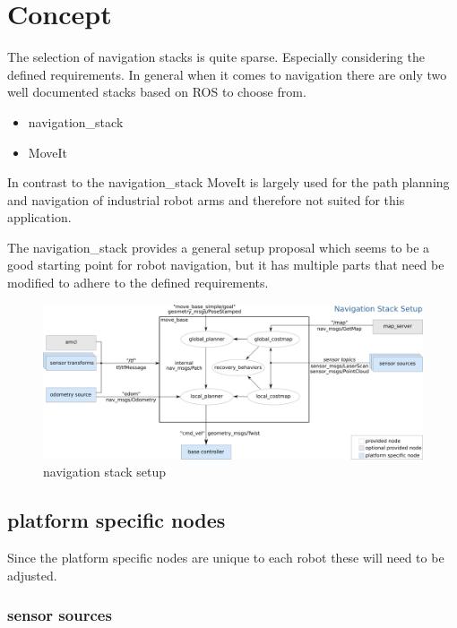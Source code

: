 \chapter{Concept}
\label{Concept}
The selection of navigation stacks is quite sparse. Especially considering the defined requirements. In general when it comes to navigation there are only two well documented stacks based on ROS to choose from.

\begin{itemize}
	\item navigation\_stack
	\item MoveIt
\end{itemize}

In contrast to the navigation\_stack MoveIt is largely used for the path planning and navigation of industrial robot arms and therefore not suited for this application.

The navigation\_stack provides a general setup proposal which seems to be a good starting point for robot navigation, but it has multiple parts that need be modified to adhere to the defined requirements.

\begin{figure}[H]
	\centering
	\includegraphics[width=\textwidth]{Pictures/navigation stack setup}
	\caption{navigation stack setup\cite{movebase}}
	
	\label{navigation stack setup}
\end{figure}


\section{platform specific nodes}
Since the platform specific nodes are unique to each robot these will need to be adjusted.\\
\subsection{sensor sources}

